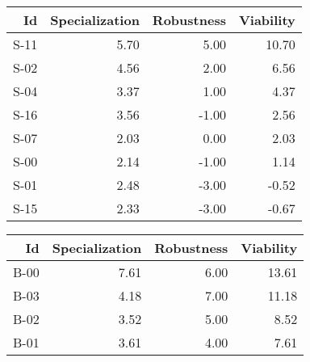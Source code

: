 


\begin{tabular}{ | r | r | r | r | }
    \hline
                    Id  &  Specialization  &      Robustness  &       Viability  \\
    \hline
    \hline
                  S-11  &            5.70  &            5.00  &           10.70  \\
    \hline
                  S-02  &            4.56  &            2.00  &            6.56  \\
    \hline
                  S-04  &            3.37  &            1.00  &            4.37  \\
    \hline
                  S-16  &            3.56  &           -1.00  &            2.56  \\
    \hline
                  S-07  &            2.03  &            0.00  &            2.03  \\
    \hline
                  S-00  &            2.14  &           -1.00  &            1.14  \\
    \hline
                  S-01  &            2.48  &           -3.00  &           -0.52  \\
    \hline
                  S-15  &            2.33  &           -3.00  &           -0.67  \\
    \hline
\end{tabular}


\begin{tabular}{ | r | r | r | r | }
    \hline
                    Id  &  Specialization  &      Robustness  &       Viability  \\
    \hline
    \hline
                  B-00  &            7.61  &            6.00  &           13.61  \\
    \hline
                  B-03  &            4.18  &            7.00  &           11.18  \\
    \hline
                  B-02  &            3.52  &            5.00  &            8.52  \\
    \hline
                  B-01  &            3.61  &            4.00  &            7.61  \\
    \hline
\end{tabular}


